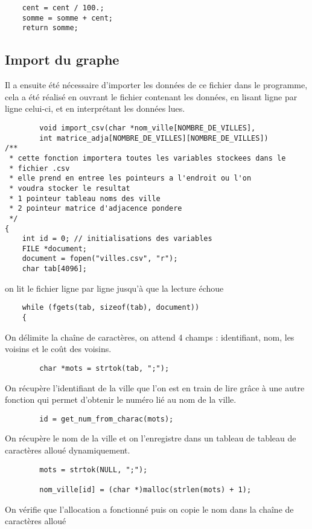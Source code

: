 \documentclass[a4paper, 12pt]{article}
\begin{document}
                \begin{lstlisting}
    cent = cent / 100.;
    somme = somme + cent;
    return somme;
                \end{lstlisting}
    \subsection{Import du graphe}
        Il a ensuite été nécessaire d'importer les données de ce fichier dans le programme, cela a été réalisé en ouvrant le fichier contenant les données, en lisant ligne par ligne celui-ci, et en interprétant les données lues.
        \begin{lstlisting}
        void import_csv(char *nom_ville[NOMBRE_DE_VILLES], 
        int matrice_adja[NOMBRE_DE_VILLES][NOMBRE_DE_VILLES])
/**
 * cette fonction importera toutes les variables stockees dans le 
 * fichier .csv
 * elle prend en entree les pointeurs a l'endroit ou l'on 
 * voudra stocker le resultat
 * 1 pointeur tableau noms des ville
 * 2 pointeur matrice d'adjacence pondere
 */
{
    int id = 0; // initialisations des variables
    FILE *document;
    document = fopen("villes.csv", "r");
    char tab[4096];\end{lstlisting}
        on lit le fichier ligne par ligne jusqu'à que la lecture échoue
        \begin{lstlisting}
    while (fgets(tab, sizeof(tab), document))
    {        \end{lstlisting}
        On délimite la chaîne de caractères,
        on attend 4 champs : identifiant, nom, les voisins et le coût des voisins.
        \begin{lstlisting}
        char *mots = strtok(tab, ";");   
                \end{lstlisting}
        On récupère l'identifiant de la ville que l'on est en train de lire grâce à une autre fonction qui permet d'obtenir le numéro lié au nom de la ville.
        \begin{lstlisting}
        id = get_num_from_charac(mots);  
                        \end{lstlisting}
        On récupère le nom de la ville et on l'enregistre dans un tableau de tableau de caractères alloué dynamiquement.
        \begin{lstlisting}
        mots = strtok(NULL, ";");                         

        nom_ville[id] = (char *)malloc(strlen(mots) + 1); 
\end{lstlisting}
        On vérifie que l'allocation a fonctionné puis on copie le nom dans la chaîne de caractères alloué
\end{document}
